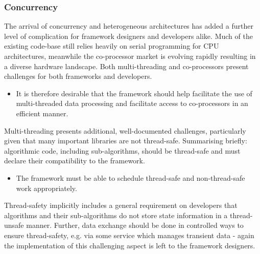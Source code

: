 \documentclass[../main-v1.tex]{subfiles}
\begin{document}
\subsubsection{Concurrency} %

The arrival of concurrency and heterogeneous architectures has added a further level of complication for framework designers and developers alike.  Much of the existing code-base still relies heavily on serial programming for CPU architectures, meanwhile the co-processor market is evolving rapidly resulting in a diverse hardware landscape.  Both multi-threading and co-processors present challenges for both frameworks and developers.  
\begin{itemize}
\item It is therefore desirable that the framework should help facilitate the use of multi-threaded data processing and facilitate access to co-processors in an efficient manner. 
\end{itemize}


Multi-threading presents additional, well-documented challenges, particularly given that many important libraries are not thread-safe.  Summarising briefly: algorithmic code, including sub-algorithms, should be thread-safe and must declare their compatibility to the framework.

\begin{itemize}

\item The framework must be able to schedule thread-safe and non-thread-safe work appropriately.  
\end{itemize}

Thread-safety implicitly includes a general requirement on developers that algorithms and their sub-algorithms do not store state information in a thread-unsafe manner.  Further, data exchange should be done in controlled ways to ensure thread-safety, e.g. via some service which manages transient data - again the implementation of this challenging aspect is left to the framework designers.
\end{document}
